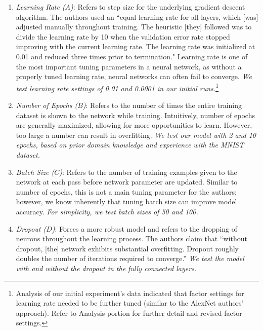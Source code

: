 \documentclass[12pt]{article}
\begin{document}
\begin{enumerate}
  
\item{\textit{Learning Rate ($A$)}: Refers to step size for the underlying gradient descent algorithm. The authors used an ``equal learning rate for all layers, which [was] adjusted manually throughout training. The heuristic [they] followed was to divide the learning rate by 10 when the validation error rate stopped improving with the current learning rate. The learning rate was initialized at 0.01 and reduced three times prior to termination." Learning rate is one of the most important tuning parameters in a neural network, as without a properly tuned learning rate, neural networks can often fail to converge.  \textit{We test learning rate settings of 0.01 and 0.0001 in our initial runs.}\footnote{Analysis of our initial experiment’s data indicated that factor settings for learning rate needed to be further tuned (similar to the AlexNet authors’ approach). Refer to Analysis portion for further detail and revised factor settings.}}

\item{\textit{Number of Epochs ($B$)}: Refers to the number of times the entire training dataset is shown to the network while training. Intuitively, number of epochs are generally maximized, allowing for more opportunities to learn. However, too large a number can result in overfitting. \textit{We test our model with 2 and 10 epochs, based on prior domain knowledge and experience with the MNIST dataset.}}

\item{\textit{Batch Size ($C$)}: Refers to the number of training examples given to the network at each pass before network parameter are updated. Similar to number of epochs, this is not a main tuning parameter for the authors; however, we know inherently that tuning batch size can improve model accuracy. \textit{For simplicity, we test batch sizes of 50 and 100.}}

\item{\textit{Dropout ($D$)}: Forces a more robust model and refers to the dropping of neurons throughout the learning process. The authors claim that “without dropout, [the] network exhibits substantial overfitting. Dropout roughly doubles the number of iterations required to converge.”   \textit{We test the model with and without the dropout in the fully connected layers. }}


\end{enumerate}
\end{document}
